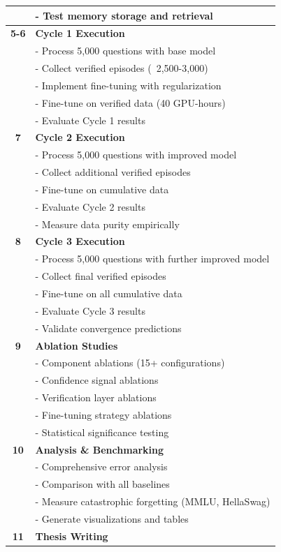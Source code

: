 \documentclass[12pt,a4paper]{article}
\theoremstyle{definition}
\begin{document}
\begin{table}[htbp]
\begin{tabular}{cp{9cm}}
& - Test memory storage and retrieval \\
\midrule
\textbf{5-6} & \textbf{Cycle 1 Execution} \\
& - Process 5,000 questions with base model \\
& - Collect verified episodes (~2,500-3,000) \\
& - Implement fine-tuning with regularization \\
& - Fine-tune on verified data (40 GPU-hours) \\
& - Evaluate Cycle 1 results \\
\midrule
\textbf{7} & \textbf{Cycle 2 Execution} \\
& - Process 5,000 questions with improved model \\
& - Collect additional verified episodes \\
& - Fine-tune on cumulative data \\
& - Evaluate Cycle 2 results \\
& - Measure data purity empirically \\
\midrule
\textbf{8} & \textbf{Cycle 3 Execution} \\
& - Process 5,000 questions with further improved model \\
& - Collect final verified episodes \\
& - Fine-tune on all cumulative data \\
& - Evaluate Cycle 3 results \\
& - Validate convergence predictions \\
\midrule
\textbf{9} & \textbf{Ablation Studies} \\
& - Component ablations (15+ configurations) \\
& - Confidence signal ablations \\
& - Verification layer ablations \\
& - Fine-tuning strategy ablations \\
& - Statistical significance testing \\
\midrule
\textbf{10} & \textbf{Analysis \& Benchmarking} \\
& - Comprehensive error analysis \\
& - Comparison with all baselines \\
& - Measure catastrophic forgetting (MMLU, HellaSwag) \\
& - Generate visualizations and tables \\
\midrule
\textbf{11} & \textbf{Thesis Writing} \\

\end{tabular}
\end{table}
\end{document}
